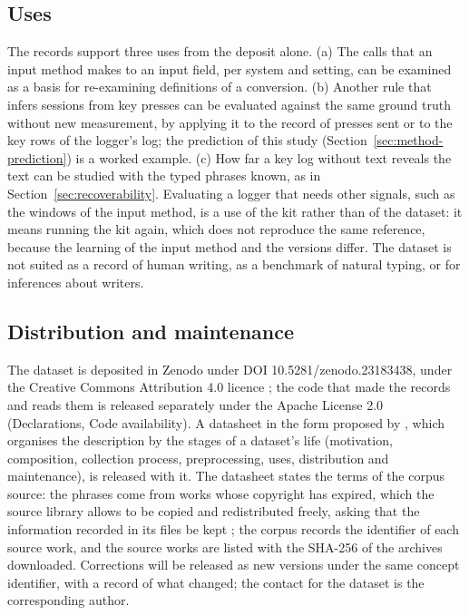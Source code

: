 \subsection{Uses}
\label{sec:dataset-uses}

The records support three uses from the deposit alone. (a) The calls that an input method makes to an input field, per
system and setting, can be examined as a basis for re-examining definitions of a conversion. (b) Another rule that
infers sessions from key presses can be evaluated against the same ground truth without new measurement, by applying it
to the record of presses sent or to the key rows of the logger's log; the prediction of this study
(Section~\ref{sec:method-prediction}) is a worked example. (c) How far a key log without text reveals the text can be
studied with the typed phrases known, as in Section~\ref{sec:recoverability}. Evaluating a logger that needs other
signals, such as the windows of the input method, is a use of the kit rather than of the dataset: it means running the
kit again, which does not reproduce the same reference, because the learning of the input method and the versions
differ. The dataset is not suited as a record of human writing, as a benchmark of natural typing, or for inferences
about writers.

\subsection{Distribution and maintenance}
\label{sec:dataset-distribution}

The dataset is deposited in Zenodo under DOI 10.5281/zenodo.23183438, under the Creative Commons Attribution 4.0
licence \citep{dataset}; the code that made the records and reads them is released separately under the Apache License
2.0 (Declarations, Code availability). A datasheet in the form proposed by \citet{gebru2021}, which organises the
description by the stages of a dataset's life (motivation, composition, collection process, preprocessing, uses,
distribution and maintenance), is released with it. The datasheet states the terms of the corpus source: the phrases come from works whose copyright has expired, which the source
library allows to be copied and redistributed freely, asking that the information recorded in its files be kept
\citep{aozora,aozora-terms}; the corpus records the identifier of each source work, and the source works are listed
with the SHA-256 of the archives downloaded. Corrections will be released as new versions under the same concept
identifier, with a record of what changed; the contact for the dataset is the corresponding author.
